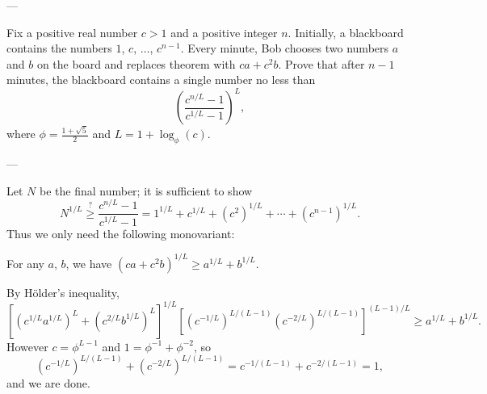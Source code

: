 
---

Fix a positive real number $c>1$ and a positive integer $n$. Initially, a blackboard contains the numbers $1$, $c$, $\ldots$, $c^{n-1}$. Every minute, Bob chooses two numbers $a$ and $b$ on the board and replaces theorem with $ca+c^2b$. Prove that after $n-1$ minutes, the blackboard contains a single number no less than \[\left(\frac{c^{n/L}-1}{c^{1/L}-1}\right)^L,\]
where $\phi=\tfrac{1+\sqrt5}2$ and $L=1+\log_{\phi}(c)$.

---

Let $N$ be the final number; it is sufficient to show \[N^{1/L}\stackrel?\ge\frac{c^{n/L}-1}{c^{1/L}-1}=1^{1/L}+c^{1/L}+\left(c^2\right)^{1/L}+\cdots+\left(c^{n-1}\right)^{1/L}.\]
Thus we only need the following monovariant:
\begin{iclaim*}
    For any $a$, $b$, we have $\left(ca+c^2b\right)^{1/L}\ge a^{1/L}+b^{1/L}$.
\end{iclaim*}
By H\"older's inequality, \[ \left[\left(c^{1/L}a^{1/L}\right)^L+\left(c^{2/L}b^{1/L}\right)^L\right]^{1/L}\left[\left(c^{-1/L}\right)^{L/(L-1)}\left(c^{-2/L}\right)^{L/(L-1)}\right]^{(L-1)/L}\ge a^{1/L}+b^{1/L}.\]
However $c=\phi^{L-1}$ and $1=\phi^{-1}+\phi^{-2}$, so \[\left(c^{-1/L}\right)^{L/(L-1)}+\left(c^{-2/L}\right)^{L/(L-1)}=c^{-1/(L-1)}+c^{-2/(L-1)}=1,\]
and we are done.

